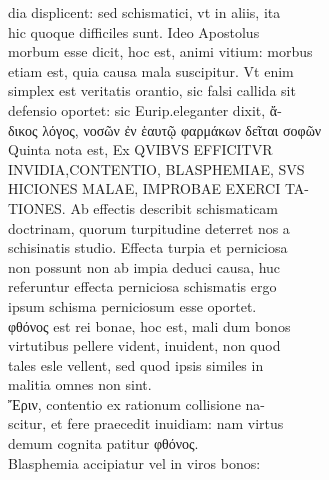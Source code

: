 \documentclass{article}
\begin{document}
\begin{pages}
                dia displicent: sed schismatici, vt in aliis, ita \\
                hic quoque difficiles sunt. Ideo Apostolus \\
                morbum esse dicit, hoc est, animi vitium: morbus \\
                etiam est, quia causa mala suscipitur. Vt enim \\
                simplex est veritatis orantio, sic falsi callida sit \\
                defensio oportet: sic Eurip.eleganter dixit, ἄ- \\
                δικος λόγος, νοσῶν ἐν ἑαυτῷ φαρμάκων δεῖται σοφῶν \\
                Quinta nota est, Ex QVIBVS EFFICITVR \\
                INVIDIA,CONTENTIO, BLASPHEMIAE, SVS \\
                HICIONES MALAE, IMPROBAE EXERCI TA- \\
                TIONES. Ab effectis describit schismaticam \\
                doctrinam, quorum turpitudine deterret nos a \\
                schisinatis studio. Effecta turpia et perniciosa \\
                non possunt non ab impia deduci causa, huc \\
                referuntur effecta perniciosa schismatis ergo \\
                ipsum schisma perniciosum esse oportet. \\
                φθόνος est rei bonae, hoc est, mali dum bonos \\
                virtutibus pellere vident, inuident, non quod \\
                tales esle vellent, sed quod ipsis similes in \\
                malitia omnes non sint. \\
                Ἔριν, contentio ex rationum collisione na- \\
                scitur, et fere praecedit inuidiam: nam virtus \\
                demum cognita patitur φθόνος. \\
                Blasphemia accipiatur vel in viros bonos: \\

\end{pages}
\end{document}
